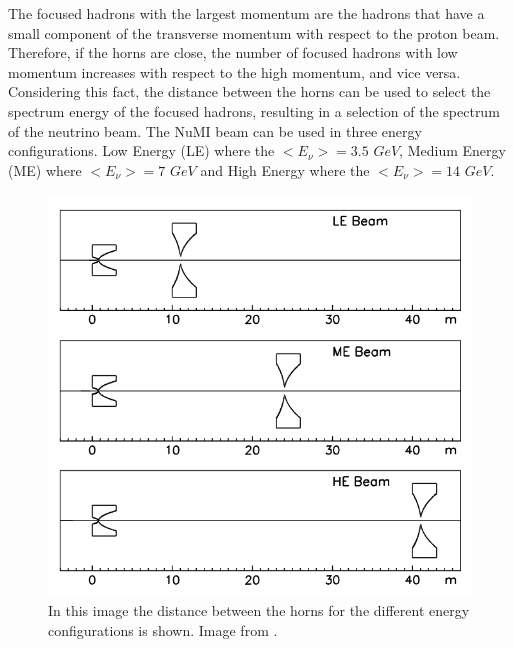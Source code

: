 The focused hadrons with the largest momentum are the hadrons that have a small component of the transverse momentum with respect to the proton beam. Therefore, if the horns are close, the number of focused hadrons with low momentum increases with respect to the high momentum, and vice versa. Considering this fact, the distance between the horns can be used to select the spectrum energy of the focused hadrons, resulting in a selection of the spectrum of the neutrino beam. The NuMI beam can be used in three energy configurations. Low Energy (LE) where the $<E_\nu>=3.5$ $GeV$, Medium Energy (ME) where $<E_\nu>=7$ $GeV$ and High Energy where the $<E_\nu> = 14$ $GeV$\cite{BeamOptics}. 

\begin{figure}[!htb]
\centering
\includegraphics[scale=0.4]{Figures/Chapter2/HornsDistance.png}
        \caption{In this image the distance between the horns for the different energy configurations is shown. Image from \cite{BeamOptics}.} 
\label{fig:MnvExp:NuMI:NuMIHornDistance}
\end{figure}

